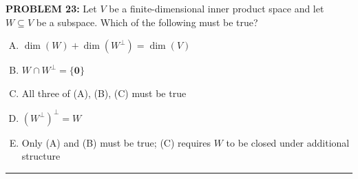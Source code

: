 \documentclass[12pt]{amsart}
\newcommand{\divider}{
  \vspace{-1em} %
  \noindent
  \raisebox{-0.15ex}{\textbullet}%
  \hspace{0.5em}%
  \rule[0.5ex]{0.95\textwidth}{1.0pt}%
  \hspace{0.5em}%
  \raisebox{-0.15ex}{\textbullet}%
  \vspace{0em} %
}
\begin{document}
{\bf PROBLEM 23:}
%
Let $V$ be a finite-dimensional inner product space and let $W \subseteq V$
be a subspace.  Which of the following must be true?
%
\begin{enumerate}[(A)]
\item $\dim(W) + \dim(W^\perp) = \dim(V)$
\item $W \cap W^\perp = \{\mathbf{0}\}$
\item All three of (A), (B), (C) must be true
\item $(W^\perp)^\perp = W$
\item Only (A) and (B) must be true; (C) requires $W$ to be closed under additional structure
\end{enumerate}
%
%
%
%
%
%
%
%
\divider
\end{document}
